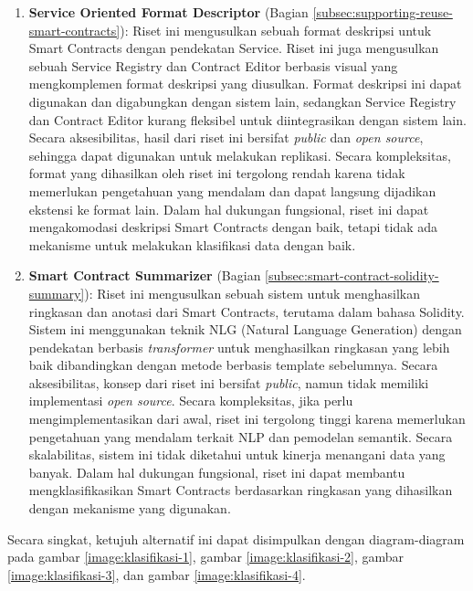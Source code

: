 \begin{enumerate}
	\item \textbf{Service Oriented Format Descriptor} \parencite{guida2019supporting} (Bagian \ref{subsec:supporting-reuse-smart-contracts}): Riset ini mengusulkan sebuah format deskripsi untuk Smart Contracts dengan pendekatan Service. Riset ini juga mengusulkan sebuah Service Registry dan Contract Editor berbasis visual yang mengkomplemen format deskripsi yang diusulkan. Format deskripsi ini dapat digunakan dan digabungkan dengan sistem lain, sedangkan Service Registry dan Contract Editor kurang fleksibel untuk diintegrasikan dengan sistem lain. Secara aksesibilitas, hasil dari riset ini bersifat \textit{public} dan \textit{open source}, sehingga dapat digunakan untuk melakukan replikasi. Secara kompleksitas, format yang dihasilkan oleh riset ini tergolong rendah karena tidak memerlukan pengetahuan yang mendalam dan dapat langsung dijadikan ekstensi ke format lain. Dalam hal dukungan fungsional, riset ini dapat mengakomodasi deskripsi Smart Contracts dengan baik, tetapi tidak ada mekanisme untuk melakukan klasifikasi data dengan baik.

	\item \textbf{Smart Contract Summarizer} \parencite{zhang2021smart} (Bagian \ref{subsec:smart-contract-solidity-summary}): Riset ini mengusulkan sebuah sistem untuk menghasilkan ringkasan dan anotasi dari Smart Contracts, terutama dalam bahasa Solidity. Sistem ini menggunakan teknik NLG (Natural Language Generation) dengan pendekatan berbasis \textit{transformer} untuk menghasilkan ringkasan yang lebih baik dibandingkan dengan metode berbasis template sebelumnya. Secara aksesibilitas, konsep dari riset ini bersifat \textit{public}, namun tidak memiliki implementasi \textit{open source}. Secara kompleksitas, jika perlu mengimplementasikan dari awal, riset ini tergolong tinggi karena memerlukan pengetahuan yang mendalam terkait NLP dan pemodelan semantik. Secara skalabilitas, sistem ini tidak diketahui untuk kinerja menangani data yang banyak. Dalam hal dukungan fungsional, riset ini dapat membantu mengklasifikasikan Smart Contracts berdasarkan ringkasan yang dihasilkan dengan mekanisme yang digunakan.

\end{enumerate}

Secara singkat, ketujuh alternatif ini dapat disimpulkan dengan diagram-diagram pada gambar \ref{image:klasifikasi-1}, gambar \ref{image:klasifikasi-2}, gambar \ref{image:klasifikasi-3}, dan gambar \ref{image:klasifikasi-4}.
